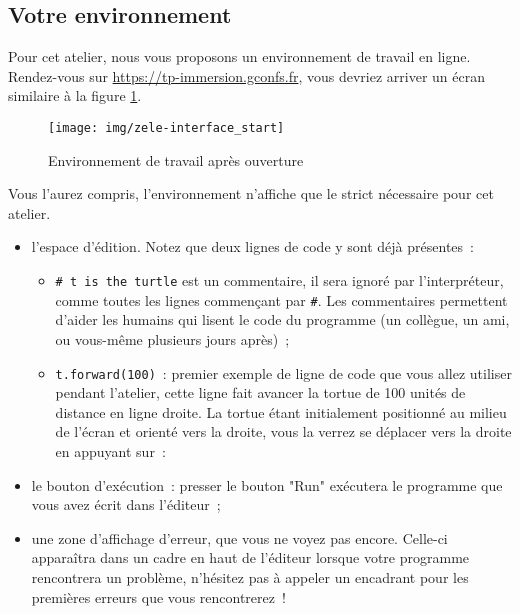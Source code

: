 \documentclass[11pt,a4paper]{article}
\begin{document}
\subsection{Votre environnement}

Pour cet atelier, nous vous proposons un environnement de travail en ligne.
Rendez-vous sur \url{https://tp-immersion.gconfs.fr}, vous devriez arriver un
écran similaire à la figure \ref{fig:zeleinterfacestart}.

\begin{figure}
    \centering
    \texttt{[image: img/zele-interface\_start]}
    \caption{Environnement de travail après ouverture\label{fig:zeleinterfacestart}}
\end{figure}

Vous l'aurez compris, l'environnement n'affiche que le strict nécessaire pour
cet atelier.

\begin{itemize}
    \item l'espace d'édition. Notez que deux lignes de code y sont déjà
        présentes~:
        \begin{itemize}
            \item \lstinline{# t is the turtle} est un commentaire, il sera
                ignoré par l'interpréteur, comme toutes les lignes commençant
                par \lstinline{#}.  Les commentaires permettent d'aider les
                humains qui lisent le code du programme (un collègue, un ami, ou
                vous-même plusieurs jours après)~;
            \item \lstinline{t.forward(100)}~: premier exemple de ligne de code
                que vous allez utiliser pendant l'atelier, cette ligne fait
                avancer la tortue de 100 unités de distance en ligne droite. La
                tortue étant initialement positionné au milieu de l'écran et
                orienté vers la droite, vous la verrez se déplacer vers la
                droite en appuyant sur~:
        \end{itemize}
    \item le bouton d'exécution~: presser le bouton "Run" exécutera le programme
        que vous avez écrit dans l'éditeur~;
    \item une zone d'affichage d'erreur, que vous ne voyez pas encore. Celle-ci
        apparaîtra dans un cadre en haut de l'éditeur lorsque votre programme
        rencontrera un problème, n'hésitez pas à appeler un encadrant pour les
        premières erreurs que vous rencontrerez~!
\end{itemize}
\end{document}
